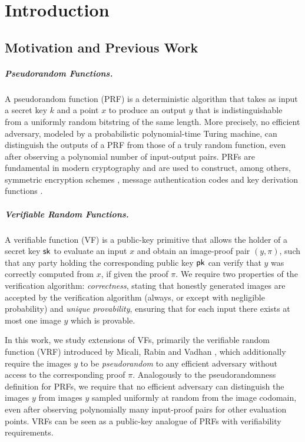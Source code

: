 
\chapter{Introduction}\label{ch:paper_introduction}

\section{Motivation and Previous Work}

\paragraph{Pseudorandom Functions.}
A pseudorandom function (PRF) \cite{GolGolMic86} is a deterministic algorithm that takes as input 
a secret key $k$ and a point $x$ to produce an output $y$ that is indistinguishable from 
a uniformly random bitstring of the same length. More precisely, no efficient adversary,
modeled by a probabilistic polynomial-time Turing machine, can distinguish the outputs of a PRF from those 
of a truly random function, even after observing a polynomial number of input-output pairs.
PRFs are fundamental in modern cryptography and are used to construct, among others, 
symmetric encryption schemes \cite{KatLin14}, message authentication codes \cite{C:BelCanKra96} and key derivation functions \cite{C:Krawczyk10}.

\paragraph{Verifiable Random Functions.} 
A verifiable function (VF) is a public-key primitive that allows the holder of a secret key $\textup{\textsf{sk}}$
to evaluate an input $x$ and obtain an image-proof pair $(y,\pi)$, such that any party holding the corresponding public key
$\textup{\textsf{pk}}$ can verify that $y$ was correctly computed from $x$, if given the proof $\pi$.
We require two properties of the verification algorithm: \textit{correctness}, 
stating that honestly generated images are accepted by the verification algorithm (always, or except with negligible probability) and 
\textit{unique provability}, ensuring that for each input there exists at most one image $y$ which is provable.

In this work, we study extensions of VFs, primarily the verifiable random function (VRF) introduced by 
Micali, Rabin and Vadhan \cite{FOCS:MicRabVad99}, which additionally require the images $y$ to be 
\textit{pseudorandom} to any efficient adversary without access to the corresponding proof $\pi$.
Analogously to the pseudorandomness definition for PRFs, we require that no efficient adversary 
can distinguish the images $y$ from images $y$ sampled uniformly at random from the image codomain, 
even after observing polynomially many input-proof pairs for other evaluation points. 
VRFs can be seen as a public-key analogue of PRFs with verifiability requirements.

